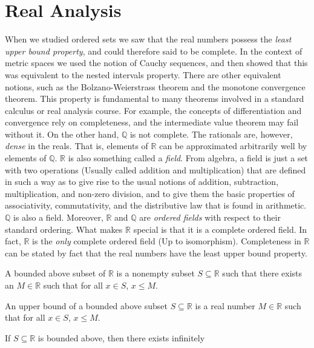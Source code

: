 \chapter{Real Analysis}
    When we studied ordered sets we saw that the real numbers possess the
    \textit{least upper bound property}, and could therefore said to be
    complete. In the context of metric spaces we used the notion of Cauchy
    sequences, and then showed that this was equivalent to the nested intervals
    property. There are other equivalent notions, such as the
    Bolzano-Weierstrass theorem and the monotone convergence theorem.
    This property is fundamental to many theorems involved in a standard
    calculus or real analysis course. For example, the concepts of
    differentiation and convergence rely on completeness, and the intermediate
    value theorem may fail without it. On the other hand, $\mathbb{Q}$ is not
    complete. The rationals are, however, \textit{dense} in the reals. That is,
    elements of $\mathbb{R}$ can be approximated arbitrarily well by elements of
    $\mathbb{Q}$. $\mathbb{R}$ is also something called a \textit{field}. From
    algebra, a field is just a set with two operations (Usually called addition
    and multiplication) that are defined in such a way as to give rise to the
    usual notions of addition, subtraction, multiplication, and non-zero
    division, and to give them the basic properties of associativity,
    commutativity, and the distributive law that is found in arithmetic.
    $\mathbb{Q}$ is also a field. Moreover, $\mathbb{R}$ and $\mathbb{Q}$ are
    \textit{ordered fields} with respect to their standard ordering. What makes
    $\mathbb{R}$ special is that it is a complete ordered field. In fact,
    $\mathbb{R}$ is the \textit{only} complete ordered field (Up to
    isomorphism). Completeness in $\mathbb{R}$ can be stated by fact that the
    real numbers have the least upper bound property.
    \begin{definition}
        A bounded above subset of $\mathbb{R}$ is a nonempty subset
        $S\subseteq{\mathbb{R}}$ such that there exists an $M\in\mathbb{R}$ such
        that for all $x\in{S}$, $x\leq{M}$.
    \end{definition}
    \begin{definition}
        An upper bound of a bounded above subset $S\subseteq\mathbb{R}$ is a
        real number $M\in\mathbb{R}$ such that for all $x\in{S}$, $x\leq{M}$.
    \end{definition}
    If $S\subseteq\mathbb{R}$ is bounded above, then there exists infinitely
